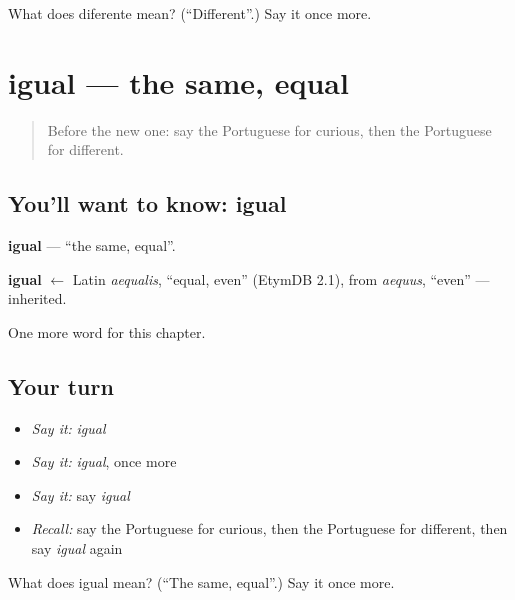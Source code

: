 \begin{tcolorbox}[breakable,colback=teal!4,colframe=teal!35!black,title={Before you move on}]
What does diferente mean? (\textquotedblleft{}Different\textquotedblright{}.) Say it once more.
\end{tcolorbox}
\section[igual]{igual — the same, equal}

\label{lesson:PT-C186-igual}



\begin{quote}
Before the new one: say the Portuguese for curious, then the Portuguese for different.
\end{quote}

\subsection*{You'll want to know: igual}
\textbf{igual} — \textquotedblleft{}the same, equal\textquotedblright{}.

\begin{cousinweb}
\textbf{igual} $\leftarrow$ Latin \emph{aequalis}, \textquotedblleft{}equal, even\textquotedblright{} (EtymDB 2.1), from \emph{aequus}, \textquotedblleft{}even\textquotedblright{} — inherited.
\end{cousinweb}

\begin{grammarlens}[title={What you've built}]
One more word for this chapter.
\end{grammarlens}

\subsection*{Your turn}
\begin{itemize}
\raggedright
  \item \emph{Say it:} \emph{igual}
  \item \emph{Say it:} \emph{igual}, once more
  \item \emph{Say it:} say \emph{igual}
  \item \emph{Recall:} say the Portuguese for curious, then the Portuguese for different, then say \emph{igual} again
\end{itemize}

\begin{tcolorbox}[breakable,colback=teal!4,colframe=teal!35!black,title={Before you move on}]
What does igual mean? (\textquotedblleft{}The same, equal\textquotedblright{}.) Say it once more.
\end{tcolorbox}
